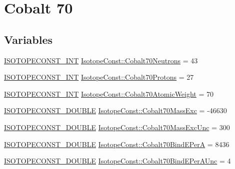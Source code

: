 \hypertarget{group___isotope_const-_cobalt-_co70}{}\section{Cobalt 70}
\label{group___isotope_const-_cobalt-_co70}
\subsection*{Variables}
\begin{DoxyCompactItemize}
\item 
\mbox{\hyperlink{group___isotope_const-_macros_ga5f18360b3e99483a35c32d789e62621c}{I\+S\+O\+T\+O\+P\+E\+C\+O\+N\+S\+T\+\_\+\+I\+NT}} \mbox{\hyperlink{group___isotope_const-_cobalt-_co70_ga20ea6696830ecbe1519386131e1f728b}{Isotope\+Const\+::\+Cobalt70\+Neutrons}} = 43
\item 
\mbox{\hyperlink{group___isotope_const-_macros_ga5f18360b3e99483a35c32d789e62621c}{I\+S\+O\+T\+O\+P\+E\+C\+O\+N\+S\+T\+\_\+\+I\+NT}} \mbox{\hyperlink{group___isotope_const-_cobalt-_co70_gabb27099ce0be4a93b9ef7e8d67956e6c}{Isotope\+Const\+::\+Cobalt70\+Protons}} = 27
\item 
\mbox{\hyperlink{group___isotope_const-_macros_ga5f18360b3e99483a35c32d789e62621c}{I\+S\+O\+T\+O\+P\+E\+C\+O\+N\+S\+T\+\_\+\+I\+NT}} \mbox{\hyperlink{group___isotope_const-_cobalt-_co70_gaad8ec5094c0ec53e6e9759d05a4a57ba}{Isotope\+Const\+::\+Cobalt70\+Atomic\+Weight}} = 70
\item 
\mbox{\hyperlink{group___isotope_const-_macros_ga8f45a7272ce02c0b4c65c44636ed719a}{I\+S\+O\+T\+O\+P\+E\+C\+O\+N\+S\+T\+\_\+\+D\+O\+U\+B\+LE}} \mbox{\hyperlink{group___isotope_const-_cobalt-_co70_ga192cf1ce171ac509269a8fafa6cb5ee0}{Isotope\+Const\+::\+Cobalt70\+Mass\+Exc}} = -\/46630
\item 
\mbox{\hyperlink{group___isotope_const-_macros_ga8f45a7272ce02c0b4c65c44636ed719a}{I\+S\+O\+T\+O\+P\+E\+C\+O\+N\+S\+T\+\_\+\+D\+O\+U\+B\+LE}} \mbox{\hyperlink{group___isotope_const-_cobalt-_co70_gad8f9d79c064b839090bbfbad0b45cedc}{Isotope\+Const\+::\+Cobalt70\+Mass\+Exc\+Unc}} = 300
\item 
\mbox{\hyperlink{group___isotope_const-_macros_ga8f45a7272ce02c0b4c65c44636ed719a}{I\+S\+O\+T\+O\+P\+E\+C\+O\+N\+S\+T\+\_\+\+D\+O\+U\+B\+LE}} \mbox{\hyperlink{group___isotope_const-_cobalt-_co70_ga8e2f206b80698b69fd7fb3896cbc7f1c}{Isotope\+Const\+::\+Cobalt70\+Bind\+E\+PerA}} = 8436
\item 
\mbox{\hyperlink{group___isotope_const-_macros_ga8f45a7272ce02c0b4c65c44636ed719a}{I\+S\+O\+T\+O\+P\+E\+C\+O\+N\+S\+T\+\_\+\+D\+O\+U\+B\+LE}} \mbox{\hyperlink{group___isotope_const-_cobalt-_co70_ga4a1b7e0e51e0f832f83005e934ca461b}{Isotope\+Const\+::\+Cobalt70\+Bind\+E\+Per\+A\+Unc}} = 4

\end{DoxyCompactItemize}

